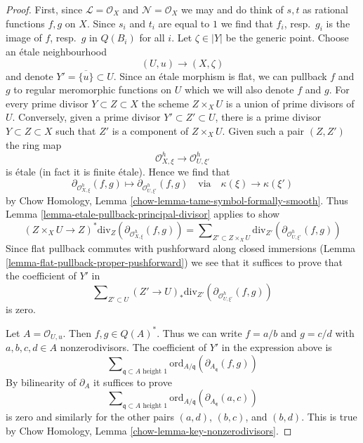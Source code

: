 \begin{proof}
\medskip\noindent
First, since $\mathcal{L} = \mathcal{O}_X$ and $\mathcal{N} = \mathcal{O}_X$
we may and do think of $s, t$ as rational functions $f, g$ on $X$.
Since $s_i$ and $t_i$ are equal to $1$ we find that $f_i$, resp.\ $g_i$
is the image of $f$, resp.\ $g$ in $Q(B_i)$ for all $i$.
Let $\zeta \in |Y|$ be the generic point. Choose an
\'etale neighbourhood
$$
(U, u) \longrightarrow (X, \zeta)
$$
and denote $Y' = \overline{\{u\}} \subset U$.
Since an \'etale morphism is flat, we can pullback $f$ and $g$
to regular meromorphic functions on $U$ which we will also denote
$f$ and $g$.
For every prime divisor $Y \subset Z \subset X$ the scheme $Z \times_X U$
is a union of prime divisors of $U$. Conversely, given a prime divisor
$Y' \subset Z' \subset U$, there is a prime divisor
$Y \subset Z \subset X$ such that $Z'$ is a component of $Z \times_X U$.
Given such a pair $(Z, Z')$ the ring map
$$
\mathcal{O}_{X, \xi}^h \to \mathcal{O}_{U, \xi'}^h
$$
is \'etale (in fact it is finite \'etale). Hence we find that
$$
\partial_{\mathcal{O}_{X, \xi}^h}(f, g) \mapsto
\partial_{\mathcal{O}_{U, \xi'}^h}(f, g)
\quad\text{via}\quad
\kappa(\xi) \to \kappa(\xi')
$$
by Chow Homology, Lemma \ref{chow-lemma-tame-symbol-formally-smooth}.
Thus Lemma \ref{lemma-etale-pullback-principal-divisor} applies to show
$$
(Z \times_X U \to Z)^*\text{div}_Z(\partial_{\mathcal{O}_{X, \xi}^h}(f, g))
=
\sum\nolimits_{Z' \subset Z \times_X U}
\text{div}_{Z'}(\partial_{\mathcal{O}_{U, \xi'}^h}(f, g))
$$
Since flat pullback commutes with pushforward along closed
immersions (Lemma \ref{lemma-flat-pullback-proper-pushforward})
we see that it suffices to prove that the coefficient
of $Y'$ in
$$
\sum\nolimits_{Z' \subset U} 
(Z' \to U)_*\text{div}_{Z'}(\partial_{\mathcal{O}_{U, \xi'}^h}(f, g))
$$
is zero.

\medskip\noindent
Let $A = \mathcal{O}_{U, u}$. Then $f, g \in Q(A)^*$.
Thus we can write $f = a/b$ and $g = c/d$ with
$a, b, c, d \in A$ nonzerodivisors.
The coefficient of $Y'$ in the expression above is
$$
\sum\nolimits_{\mathfrak q \subset A\text{ height }1}
\text{ord}_{A/\mathfrak q}(\partial_{A_\mathfrak q}(f, g))
$$
By bilinearity of $\partial_A$ it suffices to prove
$$
\sum\nolimits_{\mathfrak q \subset A\text{ height }1}
\text{ord}_{A/\mathfrak q}(\partial_{A_\mathfrak q}(a, c))
$$
is zero and similarly for the other pairs $(a, d)$, $(b, c)$, and
$(b, d)$. This is true by
Chow Homology, Lemma \ref{chow-lemma-key-nonzerodivisors}.
\end{proof}




















